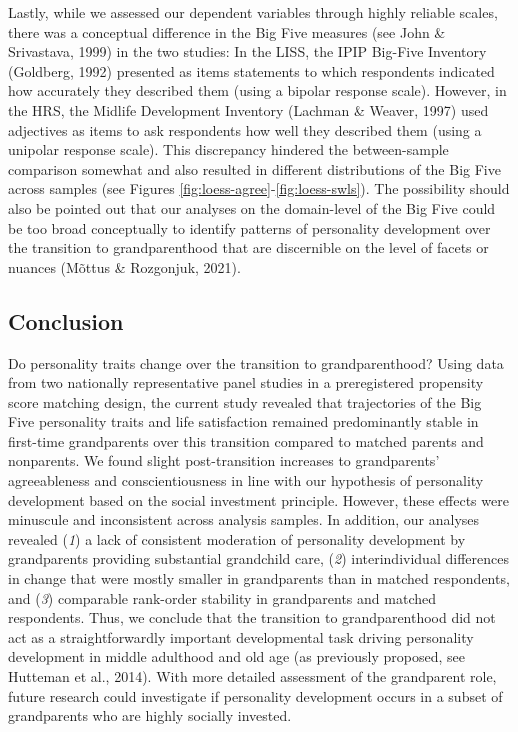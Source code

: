 \documentclass[
  english,
  man, noextraspace]{apa7}
\begin{document}
Lastly, while we assessed our dependent variables through highly reliable scales, there was a conceptual difference in the Big Five measures (see John \& Srivastava, 1999) in the two studies: In the LISS, the IPIP Big-Five Inventory (Goldberg, 1992) presented as items statements to which respondents indicated how accurately they described them (using a bipolar response scale). However, in the HRS, the Midlife Development Inventory (Lachman \& Weaver, 1997) used adjectives as items to ask respondents how well they described them (using a unipolar response scale). This discrepancy hindered the between-sample comparison somewhat and also resulted in different distributions of the Big Five across samples (see Figures \ref{fig:loess-agree}-\ref{fig:loess-swls}). The possibility should also be pointed out that our analyses on the domain-level of the Big Five could be too broad conceptually to identify patterns of personality development over the transition to grandparenthood that are discernible on the level of facets or nuances (Mõttus \& Rozgonjuk, 2021).

\hypertarget{conclusion}{%
\subsection{Conclusion}\label{conclusion}}

Do personality traits change over the transition to grandparenthood? Using data from two nationally representative panel studies in a preregistered propensity score matching design, the current study revealed that trajectories of the Big Five personality traits and life satisfaction remained predominantly stable in first-time grandparents over this transition compared to matched parents and nonparents. We found slight post-transition increases to grandparents' agreeableness and conscientiousness in line with our hypothesis of personality development based on the social investment principle. However, these effects were minuscule and inconsistent across analysis samples. In addition, our analyses revealed (\emph{1}) a lack of consistent moderation of personality development by grandparents providing substantial grandchild care, (\emph{2}) interindividual differences in change that were mostly smaller in grandparents than in matched respondents, and (\emph{3}) comparable rank-order stability in grandparents and matched respondents. Thus, we conclude that the transition to grandparenthood did not act as a straightforwardly important developmental task driving personality development in middle adulthood and old age (as previously proposed, see Hutteman et al., 2014). With more detailed assessment of the grandparent role, future research could investigate if personality development occurs in a subset of grandparents who are highly socially invested.
\end{document}
